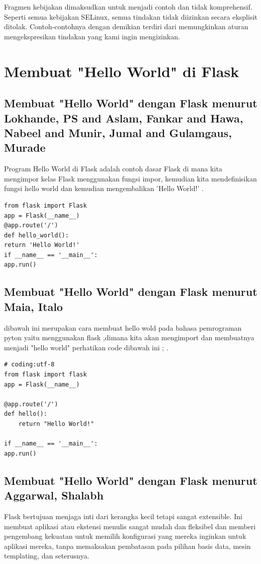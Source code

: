 Fragmen kebijakan dimaksudkan untuk menjadi contoh dan
tidak komprehensif. Seperti semua kebijakan SELinux, semua tindakan
tidak diizinkan secara eksplisit ditolak. Contoh-contohnya
dengan demikian terdiri dari memungkinkan aturan mengekspresikan tindakan yang
kami ingin mengizinkan\cite{walsh2007application}. 

 
 
\section{Membuat "Hello World" di Flask}
\subsection{Membuat "Hello World" dengan Flask menurut Lokhande, PS and Aslam, Fankar and Hawa, Nabeel and Munir, Jumal and Gulamgaus, Murade}
Program Hello World di Flask adalah contoh dasar Flask di mana kita mengimpor kelas Flask menggunakan fungsi impor, kemudian kita mendefinisikan fungsi hello world dan kemudian mengembalikan 'Hello World!' \cite{lokhande2015efficient}.
\begin{verbatim}
from flask import Flask
app = Flask(__name__)
@app.route('/')
def hello_world():
return 'Hello World!'
if __name__ == '__main__':
app.run()
\end{verbatim}

\subsection{Membuat "Hello World" dengan Flask menurut Maia, Italo}
dibawah ini merupakan cara membuat hello wold pada bahasa pemrograman pyton yaitu menggunakan flask ,dimana kita akan mengimport dan membuatnya menjadi "hello world" perhatikan code dibawah ini ;
\cite{maia2015building}.
\begin{verbatim}
# coding:utf-8
from flask import flask 
app = Flask(__name__)

@app.route('/')
def hello():
	return "Hello World!"
	
if __name__ == '__main__':
app.run()
\end{verbatim}

\subsection{Membuat "Hello World" dengan Flask menurut Aggarwal, Shalabh }
Flask bertujuan menjaga inti dari kerangka kecil tetapi sangat extensible. Ini membuat aplikasi atau ekstensi menulis sangat mudah dan fleksibel dan memberi pengembang kekuatan untuk memilih konfigurasi yang mereka inginkan untuk aplikasi mereka, tanpa memaksakan pembatasan pada pilihan basis data, mesin templating, dan seterusnya\cite{aggarwal2014flask}.


